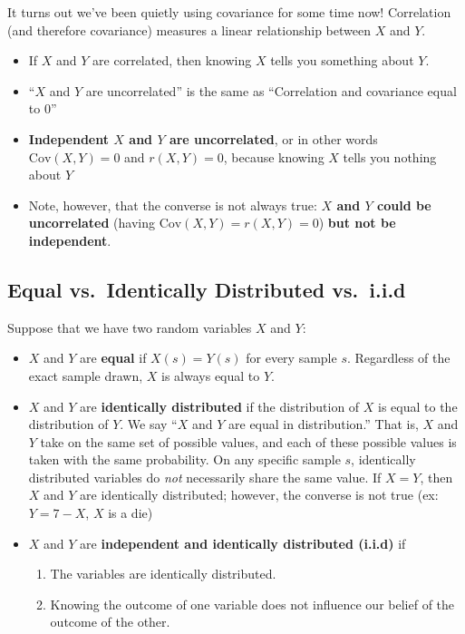 \documentclass[
  letterpaper,
  DIV=11,
  numbers=noendperiod]{scrreprt}
\providecommand{\tightlist}{%
  \setlength{\itemsep}{0pt}\setlength{\parskip}{0pt}}\usepackage{longtable,booktabs,array}
\begin{document}
It turns out we've been quietly using covariance for some time now!
Correlation (and therefore covariance) measures a linear relationship
between \(X\) and \(Y\).

\begin{itemize}
\tightlist
\item
  If \(X\) and \(Y\) are correlated, then knowing \(X\) tells you
  something about \(Y\).
\item
  ``\(X\) and \(Y\) are uncorrelated'' is the same as ``Correlation and
  covariance equal to 0''
\item
  \textbf{Independent \(X\) and \(Y\) are uncorrelated}, or in other
  words \(\text{Cov}(X, Y) =0\) and \(r(X, Y) = 0\), because knowing
  \(X\) tells you nothing about \(Y\)
\item
  Note, however, that the converse is not always true: \textbf{\(X\) and
  \(Y\) could be uncorrelated} (having
  \(\text{Cov}(X, Y) = r(X, Y) = 0\)) \textbf{but not be independent}.
\end{itemize}

\subsection{Equal vs.~Identically Distributed
vs.~i.i.d}\label{equal-vs.-identically-distributed-vs.-i.i.d}

Suppose that we have two random variables \(X\) and \(Y\):

\begin{itemize}
\tightlist
\item
  \(X\) and \(Y\) are \textbf{equal} if \(X(s) = Y(s)\) for every sample
  \(s\). Regardless of the exact sample drawn, \(X\) is always equal to
  \(Y\).
\item
  \(X\) and \(Y\) are \textbf{identically distributed} if the
  distribution of \(X\) is equal to the distribution of \(Y\). We say
  ``\(X\) and \(Y\) are equal in distribution.'' That is, \(X\) and
  \(Y\) take on the same set of possible values, and each of these
  possible values is taken with the same probability. On any specific
  sample \(s\), identically distributed variables do \emph{not}
  necessarily share the same value. If \(X = Y\), then \(X\) and \(Y\)
  are identically distributed; however, the converse is not true (ex:
  \(Y = 7 - X\), \(X\) is a die)
\item
  \(X\) and \(Y\) are \textbf{independent and identically distributed
  (i.i.d)} if

  \begin{enumerate}
  \def\labelenumi{\arabic{enumi}.}
  \tightlist
  \item
    The variables are identically distributed.
  \item
    Knowing the outcome of one variable does not influence our belief of
    the outcome of the other.
  \end{enumerate}
\end{itemize}
\end{document}
